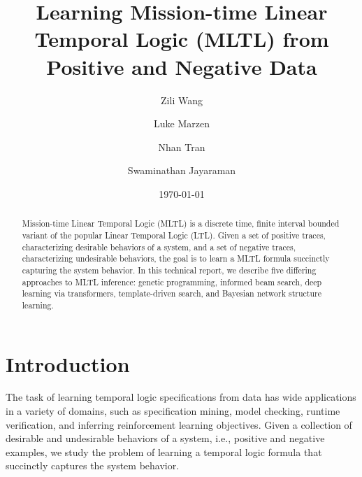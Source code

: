 \documentclass[runningheads]{llncs}
\begin{document}
\title{Learning Mission-time Linear Temporal Logic (MLTL) from Positive and Negative Data
}
%
%

\author{ 
Zili Wang
\and
Luke Marzen
\and
Nhan Tran
\and
Swaminathan Jayaraman
}
%

\date{\today}

\maketitle

\begin{abstract}
    Mission-time Linear Temporal Logic (MLTL) is a discrete time, finite interval bounded variant of the popular Linear Temporal Logic (LTL). 
    Given a set of positive traces, characterizing desirable behaviors of a system, and a set of negative traces, characterizing undesirable behaviors, the goal is to learn a MLTL formula succinctly capturing the system behavior.
    In this technical report, we describe five differing approaches to MLTL inference: genetic programming, informed beam search, deep learning via transformers, template-driven search, and Bayesian network structure learning.  
\end{abstract}

\section{Introduction}

The task of learning temporal logic specifications from data has wide applications in a variety of domains, such as specification mining, model checking, runtime verification, and inferring reinforcement learning objectives. 
Given a collection of desirable and undesirable behaviors of a system, i.e., positive and negative examples, we study the problem of learning a temporal logic formula that succinctly captures the system behavior.
\end{document}
